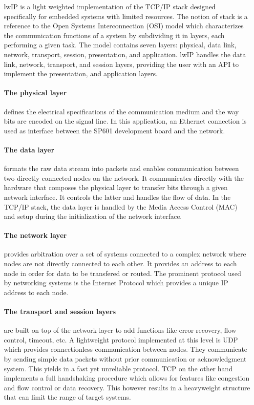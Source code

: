       lwIP is a light weighted implementation of the TCP/IP stack designed specifically for embedded systems with limited resources. The notion of stack is a reference to the Open Systems Interconnection (OSI) model which characterizes the communication functions of a system by subdividing it in layers, each performing a given task. The model contains seven layers: physical, data link, network, transport, session, presentation, and application. lwIP handles the data link, network, transport, and session layers, providing the user with an API to implement the presentation, and application layers.

      \paragraph{The physical layer} defines the electrical specifications of the communication medium and the way bits are encoded on the signal line. In this application, an Ethernet connection is used as interface between the SP601 development board and the network.

      \paragraph{The data layer} formats the raw data stream into packets and enables communication between two directly connected nodes on the network. It communicates directly with the hardware that composes the physical layer to transfer bits through a given network interface. It controls the latter and handles the flow of data. In the TCP/IP stack, the data layer is handled by the Media Access Control (MAC) and setup during the initialization of the network interface.

      \paragraph{The network layer} provides arbitration over a set of systems connected to a complex network where nodes are not directly connected to each other. It provides an address to each node in order for data to be transfered or routed. The prominent protocol used by networking systems is the Internet Protocol which provides a unique IP address to each node.

      \paragraph{The transport and session layers} are built on top of the network layer to add functions like error recovery, flow control, timeout, etc. A lightweight protocol implemented at this level is UDP which provides connectionless communication between nodes. They communicate by sending simple data packets without prior communication or acknowledgment system. This yields in a fast yet unreliable protocol. TCP on the other hand implements a full handshaking procedure which allows for features like congestion and flow control or data recovery. This however results in a heavyweight structure that can limit the range of target systems.

